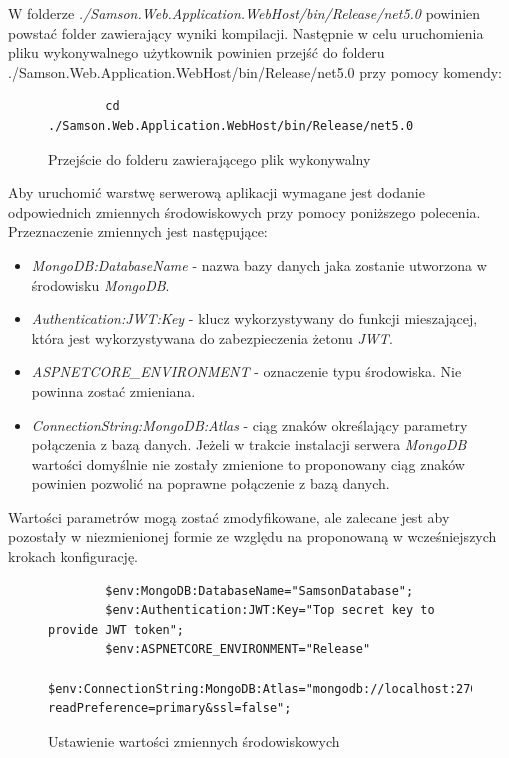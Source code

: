 \documentclass[a4paper,twoside,12pt]{book}
\begin{document}
W folderze \textit{./Samson.Web.Application.WebHost/bin/Release/net5.0} powinien powstać folder zawierający wyniki kompilacji. Następnie w celu uruchomienia pliku wykonywalnego użytkownik powinien przejść do folderu \\ ./Samson.Web.Application.WebHost/bin/Release/net5.0 przy pomocy komendy:
\begin{figure} [H]
	\centering
	\begin{lstlisting}
		cd ./Samson.Web.Application.WebHost/bin/Release/net5.0
	\end{lstlisting}
	\caption{Przejście do folderu zawierającego plik wykonywalny}
	\label{fig:aspnetChangeFolder}
\end{figure}

Aby uruchomić warstwę serwerową aplikacji wymagane jest dodanie odpowiednich zmiennych środowiskowych przy pomocy poniższego polecenia. Przeznaczenie zmiennych jest następujące:
\begin{itemize}
	\item \textit{MongoDB:DatabaseName} - nazwa bazy danych jaka zostanie utworzona w środowisku \textit{MongoDB}.
	\item \textit{Authentication:JWT:Key} - klucz wykorzystywany do funkcji mieszającej, która jest wykorzystywana do zabezpieczenia żetonu \textit{JWT}.
	\item \textit{ASPNETCORE\_ENVIRONMENT} - oznaczenie typu środowiska. Nie powinna zostać zmieniana.
	\item \textit{ConnectionString:MongoDB:Atlas} - ciąg znaków określający parametry połączenia z bazą danych. Jeżeli w trakcie instalacji serwera \textit{MongoDB} wartości domyślnie nie zostały zmienione to proponowany ciąg znaków powinien pozwolić na poprawne połączenie z bazą danych.
\end{itemize}
Wartości parametrów mogą zostać zmodyfikowane, ale zalecane jest aby pozostały w niezmienionej formie ze względu na proponowaną w wcześniejszych krokach konfigurację.
\begin{figure} [H]
	\centering
	\begin{lstlisting}
		$env:MongoDB:DatabaseName="SamsonDatabase";
		$env:Authentication:JWT:Key="Top secret key to provide JWT token";
		$env:ASPNETCORE_ENVIRONMENT="Release"
		$env:ConnectionString:MongoDB:Atlas="mongodb://localhost:27017/?readPreference=primary&ssl=false";
	\end{lstlisting}
	\caption{Ustawienie wartości zmiennych środowiskowych}
	\label{fig:varEnvironment}
\end{figure}
\end{document}
